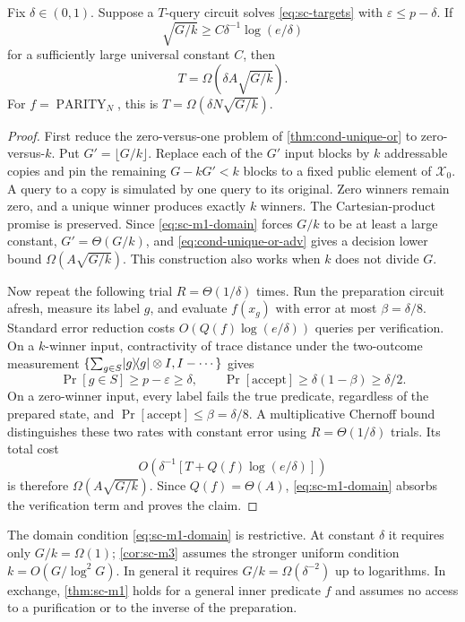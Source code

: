 \begin{theorem}
\label{thm:sc-m1}
Fix $\delta\in(0,1)$.  Suppose a $T$-query circuit solves
\eqref{eq:sc-targets} with $\varepsilon\le p-\delta$.  If
\begin{equation}
 \sqrt{G/k}\ge C\delta^{-1}\log(e/\delta)
 \label{eq:sc-m1-domain}
\end{equation}
for a sufficiently large universal constant $C$, then
\[
 T=\Omega\!\left(\delta A\sqrt{G/k}\right).
\]
For $f=\operatorname{PARITY}_N$, this is
$T=\Omega(\delta N\sqrt{G/k})$.
\end{theorem}

\begin{proof}
First reduce the zero-versus-one problem of \cref{thm:cond-unique-or} to
zero-versus-$k$.  Put $G'=\lfloor G/k\rfloor$.  Replace each of the $G'$
input blocks by $k$ addressable copies and pin the remaining
$G-kG'<k$ blocks to a fixed public element of $\mathcal X_0$.  A query to a
copy is simulated by one query to its original.  Zero winners remain zero,
and a unique winner produces exactly $k$ winners.  The Cartesian-product
promise is preserved.  Since \eqref{eq:sc-m1-domain} forces $G/k$ to be at least a large
constant, $G'=\Theta(G/k)$, and
\eqref{eq:cond-unique-or-adv} gives a decision lower bound
$\Omega(A\sqrt{G/k})$.  This construction also works when $k$ does not divide $G$.

Now repeat the following trial $R=\Theta(1/\delta)$ times.  Run the
preparation circuit afresh, measure its label $g$, and evaluate $f(x_g)$
with error at most $\beta=\delta/8$.  Standard error reduction costs
$O(Q(f)\log(e/\delta))$ queries per verification.  On a $k$-winner input,
contractivity of trace distance under the two-outcome measurement
$\{\sum_{g\in S}\lvert g\rangle\!\langle g\rvert\otimes I,I-\cdots\}$ gives
\[
 \Pr[g\in S]\ge p-\varepsilon\ge\delta,
 \qquad \Pr[\text{accept}]\ge\delta(1-\beta)\ge\delta/2.
\]
On a zero-winner input, every label fails the true predicate, regardless of
the prepared state, and $\Pr[\text{accept}]\le\beta=\delta/8$.  A
multiplicative Chernoff bound distinguishes these two rates with constant
error using $R=\Theta(1/\delta)$ trials.  Its total cost
\[
 O\!\left(\delta^{-1}
   [T+Q(f)\log(e/\delta)]\right)
\]
is therefore $\Omega(A\sqrt{G/k})$.  Since $Q(f)=\Theta(A)$,
\eqref{eq:sc-m1-domain} absorbs the verification term and proves the claim.
\end{proof}

The domain condition \eqref{eq:sc-m1-domain} is restrictive.  At
constant $\delta$ it requires only $G/k=\Omega(1)$; \cref{cor:sc-m3}
assumes the stronger uniform condition $k=O(G/\log^2G)$.  In general it
requires $G/k=\Omega(\delta^{-2})$ up to logarithms.  In exchange,
\cref{thm:sc-m1} holds for a general inner predicate $f$ and assumes no
access to a purification or to the inverse of the preparation.

